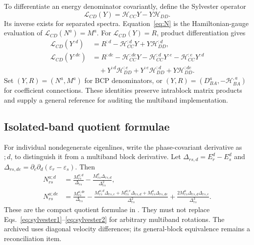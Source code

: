 \documentclass[prx,amsmath,amssymb,superscriptaddress,longbibliography]{revtex4-2}
\newcommand{\code}[1]{\texttt{\detokenize{#1}}}
\begin{document}
To differentiate an energy denominator covariantly, define the Sylvester operator
\begin{equation}
 \mathscr L_{CD}(Y)=\mathcal H_{CC}Y-Y\mathcal H_{DD}.
 \label{eq:sylvester}
\end{equation}
Its inverse exists for separated spectra. Equation~\eqref{eq:N} is the
Hamiltonian-gauge evaluation of $\mathscr L_{CD}(N^a)=M^a$.
For $\mathscr L_{CD}(Y)=R$, product differentiation gives
\begin{align}
 \mathscr L_{CD}(Y^{:d})
 &=R^{:d}-\mathcal H_{CC}^{:d}Y+Y\mathcal H_{DD}^{:d},\label{eq:sylvester1}\\
 \mathscr L_{CD}(Y^{:de})
 &=R^{:de}-\mathcal H_{CC}^{:de}Y
 -\mathcal H_{CC}^{:d}Y^{:e}-\mathcal H_{CC}^{:e}Y^{:d}
 \nonumber\\
 &\quad+Y^{:d}\mathcal H_{DD}^{:e}+Y^{:e}\mathcal H_{DD}^{:d}
       +Y\mathcal H_{DD}^{:de}.
 \label{eq:sylvester2}
\end{align}
Set $(Y,R)=(N^a,M^a)$ for BCP denominators, or
$(Y,R)=(D^a_{BA},-\mathcal H_{BA}^{,a})$ for coefficient connections.
These identities preserve intrablock matrix products and supply a general
reference for auditing the multiband implementation.

\subsection{Isolated-band quotient formulae}
For individual nondegenerate eigenlines, write the phase-covariant derivative
as $;d$, to distinguish it from a multiband block derivative.
Let $\Delta_{rs,d}=E_r^d-E_s^d$ and
$\Delta_{rs,de}=\partial_e\partial_d(\varepsilon_r-\varepsilon_s)$.
Then
\begin{align}
 N_{rs}^{a;d}
 &=\frac{M_{rs}^{a;d}}{\Delta_{rs}}
   -\frac{M_{rs}^{a}\Delta_{rs,d}}{\Delta_{rs}^2},\label{eq:Nfirst}\\
 N_{rs}^{a;de}
 &=\frac{M_{rs}^{a;de}}{\Delta_{rs}}
   -\frac{M_{rs}^{a;d}\Delta_{rs,e}+M_{rs}^{a;e}\Delta_{rs,d}
           +M_{rs}^a\Delta_{rs,de}}{\Delta_{rs}^2}
   +\frac{2M_{rs}^a\Delta_{rs,d}\Delta_{rs,e}}{\Delta_{rs}^3}.
 \label{eq:Nsecond}
\end{align}
These are the compact quotient formulae in \code{Wannier.tex}.
They must not replace Eqs.~\eqref{eq:sylvester1}--\eqref{eq:sylvester2}
for arbitrary multiband rotations. The archived \code{DerBCP} uses diagonal
velocity differences; its general-block equivalence remains a reconciliation item.
\end{document}
